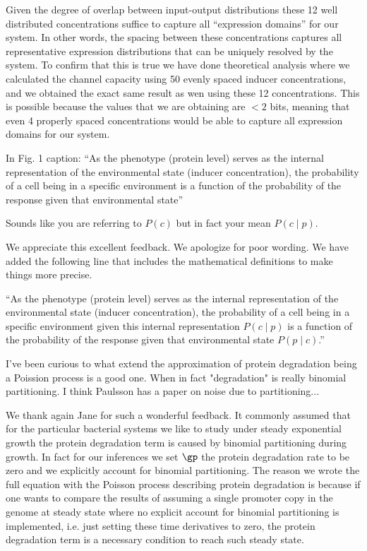 Given the degree of overlap between input-output distributions these 12 well
distributed concentrations suffice to capture all ``expression domains'' for our
system. In other words, the spacing between these concentrations captures all
representative expression distributions that can be uniquely resolved by the
system. To confirm that this is true we have done theoretical analysis where we
calculated the channel capacity using 50 evenly spaced inducer concentrations,
and we obtained the exact same result as wen using these 12 concentrations. This
is possible because the values that we are obtaining are $<2$ bits, meaning that
even 4 properly spaced concentrations would be able to capture all expression
domains for our system.

\begin{tcolorbox}
In Fig. 1 caption:
``As the phenotype (protein level) serves as the internal representation of the
environmental state (inducer concentration), the probability of a cell being in
a specific environment is a function of the probability of the response given
that environmental state''

Sounds like you are referring to $P(c)$ but in fact your mean $P(c \mid p)$.
\end{tcolorbox}

We appreciate this excellent feedback. We apologize for poor wording. We have
added the following line that includes the mathematical definitions to make
things more precise.

``As the phenotype (protein level) serves as the internal representation of the
environmental state (inducer concentration), the probability of a cell being in
a specific environment given this internal representation $P(c \mid p)$ is a
function of the probability of the response given that environmental state $P(p
\mid c)$.''

\begin{tcolorbox}
I've been curious to what extend the approximation of protein degradation being
a Poission process is a good one. When in fact "degradation" is really binomial
partitioning. I think Paulsson has a paper on noise due to partitioning...
\end{tcolorbox}

We thank again Jane for such a wonderful feedback. It commonly assumed that for
the particular bacterial systems we like to study under steady exponential
growth the protein degradation term is caused by binomial partitioning during
growth. In fact for our inferences we set $\gp$ the protein degradation rate to
be zero and we explicitly account for binomial partitioning. The reason we wrote
the full equation with the Poisson process describing protein degradation is
because if one wants to compare the results of assuming a single promoter copy
in the genome at steady state where no explicit account for binomial
partitioning is implemented, i.e. just setting these time derivatives to zero,
the protein degradation term is a necessary condition to reach such steady
state.


